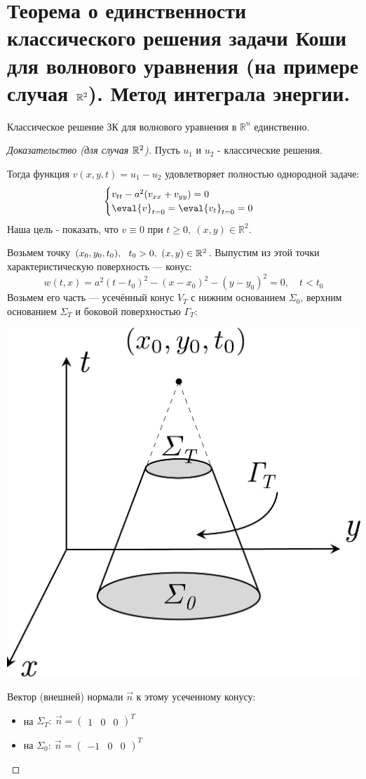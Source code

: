 \documentclass[../main.tex]{subfiles}
\begin{document}
\section[Теорема единственности для волнового уравнения]{Теорема о единственности классического решения задачи Коши для волнового уравнения (на примере случая $\mathbb{R}^2$). Метод интеграла энергии.}


\begin{theorem} Классическое решение ЗК для волнового уравнения в $\mathbb{R}^n$ единственно.
\end{theorem}
\begin{proof}[Доказательство (для случая $\mathbb{R}^2$)]
Пусть $u_{1}$ и $u_{2}$ - классические решения.

Тогда функция $v(x,y,t) = u_1 - u_2$ удовлетворяет полностью однородной задаче: 
$$
\begin{cases}
  v_{tt} - a^2(v_{xx} + v_{yy}) = 0\\
  \eval{v}_{t=0} = \eval{v_t}_{t=0} = 0
\end{cases}
$$
Наша цель - показать, что $v\equiv 0 $ при $ t\geq 0,\ (x,y) \in \mathbb{R}^2$.

Возьмем точку $ (x_0, y_0, t_0),\ \ t_0 > 0,\ (x,y) \in \mathbb{R}^2$. \; Выпустим из этой точки характеристическую поверхность --- конус:
$$ 
w(t,x) = a^2(t - t_0)^2 - (x - x_0)^2 - (y - y_0)^2 = 0,\quad t < t_0
$$
Возьмем его часть --- усечённый конус $ V_T $ с нижним основанием $ \Sigma_0 $, верхним основанием $ \Sigma_T $  и боковой поверхностью $ \Gamma_T:$
\begin{center}
\includegraphics[width=0.28\linewidth]{./pic 8.pdf}
\end{center}
Вектор (внешней) нормали $ \vec{n} $ к этому усеченному конусу:
\begin{itemize}
	\item на $\Sigma_T:\ \vec{n} = \begin{pmatrix}1 & 0 & 0\end{pmatrix}^T $
	
	\item на $\Sigma_0:\ \vec{n} = \begin{pmatrix}-1 & 0 & 0\end{pmatrix}^T $
	

\end{itemize}
\end{proof}
\end{document}
